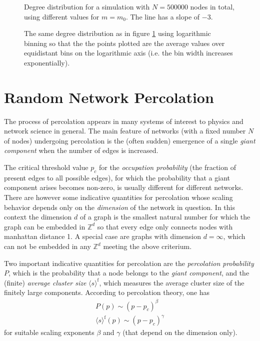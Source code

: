 \documentclass{scrartcl}
\begin{document}
\begin{figure}
    \caption{Degree distribution for a simulation with $N=500000$ nodes
    in total, using different values for $m=m_0$. The line has a slope of
    $-3$.}
    \label{fig:22_plot}
\end{figure}
\begin{figure}
    \caption{The same degree distribution as in figure \ref{fig:22_plot}
    using logarithmic binning so that the the points plotted are the average
    values over equidistant bins on the logarithmic axis (i.e. the bin width
    increases exponentially).}
    \label{fig:22_logplot}
\end{figure}
\clearpage
\clearpage


\section{Random Network Percolation}
The process of percolation appears in many systems of interest to physics
and network science in general. The main feature of networks (with a fixed
number $N$ of nodes) undergoing percolation is the (often sudden) emergence
of a single \emph{giant component} when the number of edges is increased.

The critical threshold value $p_c$ for the \emph{occupation probability}
(the fraction of present edges to all possible edges), for which the
probability that a giant component arises becomes non-zero, is usually
different for different networks. There are however some indicative
quantities for percolation whose scaling behavior depends only on the
\emph{dimension} of the network in question. In this context the dimension $d$
of a graph is the smallest natural number for which the graph can be embedded in
$\mathbb{Z}^d$ so that every edge only connects nodes with manhattan distance 1.
A special case are graphs with dimension $d=\infty$, which can not be embedded in any
$\mathbb{Z}^d$ meeting the above criterium.

Two important indicative quantities for percolation are the
\emph{percolation probability} $P$, which is the probability that a node
belongs to the \emph{giant component}, and the (finite) \emph{average
cluster size} $\langle s \rangle^\mathrm{f}$, which measures the average
cluster size of the finitely large components. According to percolation theory, one has
\begin{equation}\label{eq:coefficients}
\begin{aligned}
    P(p) \sim (p - p_c)^\beta \\
    \langle s \rangle^\mathrm{f}(p) \sim (p - p_c)^\gamma
\end{aligned}
\end{equation}
for suitable scaling exponents $\beta$ and $\gamma$ (that depend on the dimension only).
\end{document}
